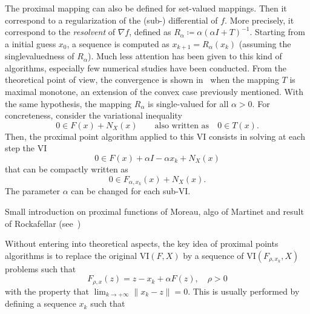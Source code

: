 The proximal mapping can also be defined for set-valued mappings.
Then it correspond to a regularization of the (sub-) differential of $f$.
More precisely, it correspond to the \emph{resolvent} of $\nabla f$,
defined as $R_\alpha\coloneqq\alpha(\alpha I + T)^{-1}$.
Starting from a initial guess $x_0$, a sequence is computed as $x_{k+1} = R_\alpha(x_k)$
(assuming the singlevaluedness of $R_\alpha$).
Much less attention has been given to this kind of algorithms,
especially few numerical studies have been conducted.
From the theoretical point of view, the convergence is shown in~\citep{rockafellar1976monotone} when
the mapping $T$ is maximal monotone, an extension of the convex case previously mentioned.
With the same hypothesis, the mapping $R_\alpha$ is single-valued for all $\alpha>0$.
For concreteness, consider the variational inequality
\begin{equation}
 0 \in F(x) + N_X(x)\qquad\text{also written as} \quad 0\in T(x).
\end{equation}
Then, the proximal point algorithm applied to this VI consists in solving at each step the VI
\begin{equation}
  0 \in F(x) + \alpha I - \alpha x_k + N_X(x)
\end{equation}
that can be compactly written as
 \begin{equation}
 0\in F_{\alpha,x_k}(x) + N_X(x).
\end{equation}
The parameter $\alpha$ can be changed for each sub-VI.


\begin{ndrva}

  Small introduction on proximal functions of Moreau, algo of Martinet
  and result of Rockafellar (see~\cite{Chen.Teboublle_SIOPT1993})
\end{ndrva}

Without entering into theoretical aspects, the key idea of proximal points algorithms is to replace the original $\mathrm{VI}(F,X)$ by a sequence of $\mathrm{VI}(F_{\rho,x_k},X)$  problems such that 
\begin{equation}
  \label{eq:prox-algo-1}
  F_{\rho,x}(z) = z - x_k+ \alpha F(z) , \quad \rho > 0 
\end{equation}
with the property that $\lim_{ k \rightarrow +\infty} \| x_k -z \| = 0$. This is usually performed by defining a sequence $x_k$ such that
\fi

